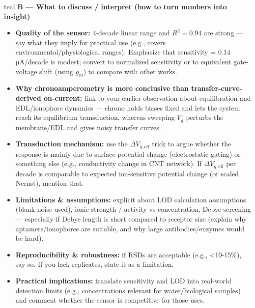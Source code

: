 \begin{color}{teal}
\noindent\textbf{B — What to discuss / interpret (how to turn numbers into insight)}
\begin{itemize}
    \item \textbf{Quality of the sensor:} 4-decade linear range and \(R^2=0.94\) are strong — say what they imply for practical use (e.g., covers environmental/physiological ranges). Emphasize that sensitivity = 0.14 µA/decade is modest; convert to normalized sensitivity or to equivalent gate-voltage shift (using \(g_m\)) to compare with other works.
    \item \textbf{Why chronoamperometry is more conclusive than transfer-curve-derived on-current:} link to your earlier observation about equilibration and EDL/ionophore dynamics — chrono holds biases fixed and lets the system reach its equilibrium transduction, whereas sweeping \(V_g\) perturbs the membrane/EDL and gives noisy transfer curves.
    \item \textbf{Transduction mechanism:} use the \(\Delta V_{g,\text{eff}}\) trick to argue whether the response is mainly due to surface potential change (electrostatic gating) or something else (e.g., conductivity change in CNT network). If \(\Delta V_{g,\text{eff}}\) per decade is comparable to expected ion-sensitive potential change (or scaled Nernst), mention that.
    \item \textbf{Limitations \& assumptions:} explicit about LOD calculation assumptions (blank noise used), ionic strength / activity vs concentration, Debye screening — especially if Debye length is short compared to receptor size (explain why aptamers/ionophores are suitable, and why large antibodies/enzymes would be hard).
    \item \textbf{Reproducibility \& robustness:} if RSDs are acceptable (e.g., <10-15\%), say so. If you lack replicates, state it as a limitation.
    \item \textbf{Practical implications:} translate sensitivity and LOD into real-world detection limits (e.g., concentrations relevant for water/biological samples) and comment whether the sensor is competitive for those uses.
\end{itemize}

\bigskip


\end{color}

